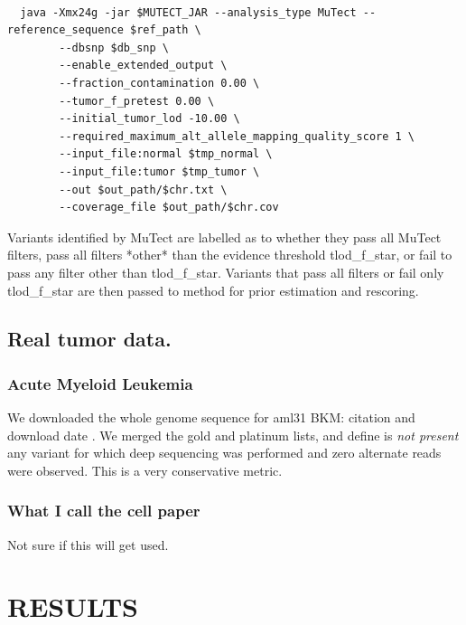 \documentclass[a4,center,fleqn]{NAR}
\newcommand{\bkmcomment}[1]{{\color{blue}BKM: #1}}
\begin{document}
\begin{tiny}
\begin{verbatim}

  java -Xmx24g -jar $MUTECT_JAR --analysis_type MuTect --reference_sequence $ref_path \
        --dbsnp $db_snp \
        --enable_extended_output \
        --fraction_contamination 0.00 \
        --tumor_f_pretest 0.00 \
        --initial_tumor_lod -10.00 \
        --required_maximum_alt_allele_mapping_quality_score 1 \
        --input_file:normal $tmp_normal \
        --input_file:tumor $tmp_tumor \
        --out $out_path/$chr.txt \
        --coverage_file $out_path/$chr.cov

\end{verbatim}
\end{tiny}
Variants identified by MuTect are labelled as to whether they pass all MuTect filters, pass all filters *other* than the evidence threshold \textrm{tlod\_f\_star}, or fail to pass any filter other than \textrm{tlod\_f\_star}. Variants that pass all filters or fail only \textrm{tlod\_f\_star} are then passed to {method} for prior estimation and rescoring.

\subsection{Real tumor data.}
\subsubsection{Acute Myeloid Leukemia}
We downloaded the whole genome sequence for aml31 \bkmcomment{citation and download date} \cite{Griffith2015}.
We merged the gold and platinum lists, and define is \textit{not present} any variant for which deep sequencing was performed and zero alternate reads were observed.
This is a very conservative metric.
\subsubsection{What I call the cell paper} Not sure if this will get used.



\section{RESULTS}
\end{document}
